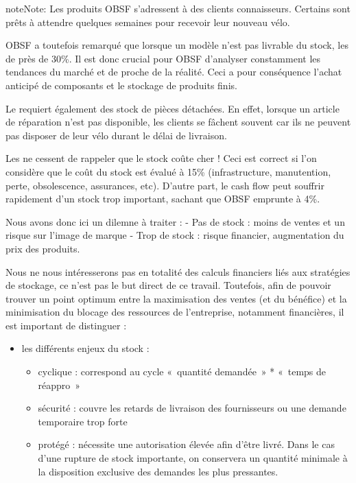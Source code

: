 \documentclass[letterpaper,10pt,french]{sphinxmanual}
\begin{document}
\begin{sphinxadmonition}{note}{Note:}
Les produits OBSF s’adressent à des clients connaisseurs. Certains sont prêts à attendre quelques semaines pour recevoir leur nouveau vélo.

OBSF a toutefois remarqué que lorsque un modèle n’est pas livrable du stock, les  de près de 30\%. Il est donc crucial pour OBSF d’analyser constamment les tendances du marché et de  proche de la réalité. Ceci a pour conséquence l’achat anticipé de composants et le stockage de produits finis.

Le  requiert également des stock de pièces détachées. En effet, lorsque un article de réparation n’est pas disponible, les clients se fâchent souvent car ils ne peuvent pas disposer de leur vélo durant le délai de livraison.

Les  ne cessent de rappeler que le stock coûte cher ! Ceci est correct si l’on considère que le coût du stock est évalué à 15\% (infrastructure, manutention, perte, obsolescence, assurances, etc). D’autre part, le cash flow peut souffrir rapidement d’un stock trop important, sachant que OBSF emprunte à 4\%.

Nous avons donc ici un dilemne à traiter :
-    Pas de stock : moins de ventes et un risque sur l’image de marque
-    Trop de stock : risque financier, augmentation du prix des produits.

Nous ne nous intéresserons pas en totalité des calculs financiers liés aux stratégies de stockage, ce n’est pas le but direct de ce travail. Toutefois, afin de pouvoir trouver un point optimum entre la maximisation des ventes (et du bénéfice) et la minimisation du blocage des ressources de l’entreprise, notamment financières, il est important de distinguer :
\begin{itemize}
\item {} 
les différents enjeux du stock :
\begin{itemize}
\item {} 
cyclique : correspond au cycle « quantité demandée » * « temps de réappro »

\item {} 
sécurité : couvre les retards de livraison des fournisseurs ou une demande temporaire trop forte

\item {} 
protégé  : nécessite une autorisation élevée afin d’être livré. Dans le cas d’une rupture de stock importante, on conservera un quantité minimale à la disposition exclusive des demandes les plus pressantes.


\end{itemize}
\end{itemize}
\end{sphinxadmonition}
\end{document}
